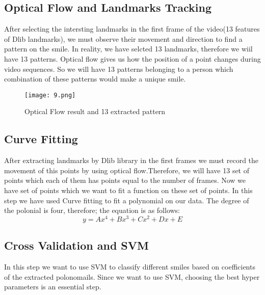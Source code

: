 \documentclass{article}
\begin{document}
{\subsection{Optical Flow and Landmarks Tracking}
\par{After selecting the intersting landmarks in the first frame of the video(13 features of Dlib landmarks), we must observe their movement and direction to find a pattern on the smile. In reality, we have selcted 13 landmarks, therefore we wiil have 13 patterns. Optical flow gives us how the position of a point changes during video sequences. So we will have 13 patterns belonging to a person which combination of these patterns would make a unique smile.}

\begin{figure}[H]
    \centering
   \texttt{[image: 9.png]}
   \caption{Optical Flow result and 13 extracted pattern}
   \label{simulationfigure}
\end{figure}



\subsection{Curve Fitting}
\par{After extracting landmarks by Dlib library in the first frames we must record the movement of this points by using optical flow.Therefore, we will have 13 set of points which each of them has points equal to the number of frames. Now we have set of points which we want to fit a function on these set of points. In this step we have used Curve fitting to fit a polynomial on our data. The degree of the polonial is four, therefore; the equation is as follows:}
\begin{equation}
  \label{simple_equation}
 y =Ax^4+Bx^3+Cx^2+Dx+E
\end{equation}


\subsection{Cross Validation and SVM}
\par{ In this step we want to use SVM to classify different smiles based on coefficients of the extracted polonomails. Since we want to use SVM, choosing the best hyper parameters is an essential step.}
}
\end{document}
